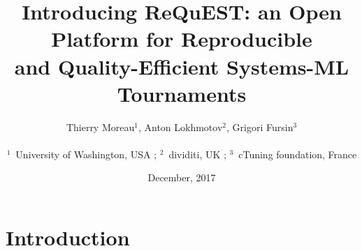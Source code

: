 \documentclass[10pt,letterpaper,twocolumn]{article}
\begin{document}
\title{Introducing ReQuEST: an Open Platform for Reproducible\\and Quality-Efficient Systems-ML Tournaments}

\author{Thierry Moreau$^{1}$, Anton Lokhmotov$^{2}$, Grigori Fursin$^{3}$ \\
\\
$^1$~University of Washington, USA ; $^2$~dividiti, UK ; $^3$~cTuning foundation, France\\
}

\date{December, 2017}





\maketitle

\begin{abstract}
 
\end{abstract}



\section{Introduction} %
\label{introduction} %
\end{document}
